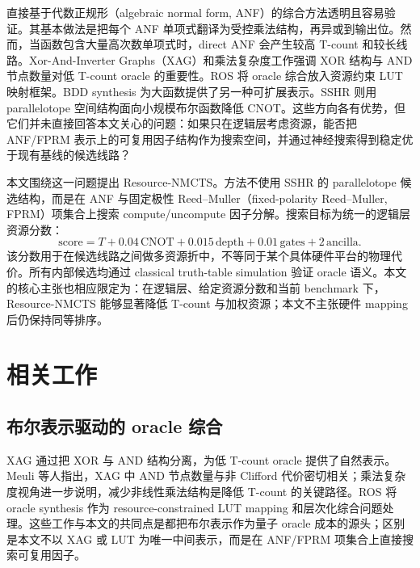 \documentclass[UTF8,fontset=macnew,11pt]{ctexart}
\newcommand{\method}{Resource-NMCTS}
\newcommand{\score}{\mathrm{score}}
\begin{document}
直接基于代数正规形（algebraic normal form, ANF）的综合方法透明且容易验证。其基本做法是把每个 ANF 单项式翻译为受控乘法结构，再异或到输出位。然而，当函数包含大量高次数单项式时，direct ANF 会产生较高 T-count 和较长线路。Xor-And-Inverter Graphs（XAG）和乘法复杂度工作强调 XOR 结构与 AND 节点数量对低 T-count oracle 的重要性\cite{meuli2022xag,meuli2019multiplicative}。ROS 将 oracle 综合放入资源约束 LUT 映射框架\cite{meuli2020ros}。BDD synthesis 为大函数提供了另一种可扩展表示\cite{wille2009bdd}。SSHR 则用 parallelotope 空间结构面向小规模布尔函数降低 CNOT\cite{zheng2025sshr}。这些方向各有优势，但它们并未直接回答本文关心的问题：如果只在逻辑层考虑资源，能否把 ANF/FPRM 表示上的可复用因子结构作为搜索空间，并通过神经搜索得到稳定优于现有基线的候选线路？

本文围绕这一问题提出 \method{}。方法不使用 SSHR 的 parallelotope 候选结构，而是在 ANF 与固定极性 Reed--Muller（fixed-polarity Reed--Muller, FPRM）项集合上搜索 compute/uncompute 因子分解。搜索目标为统一的逻辑层资源分数：
\begin{equation}
  \score = T + 0.04\,\mathrm{CNOT} + 0.015\,\mathrm{depth}
         + 0.01\,\mathrm{gates} + 2\,\mathrm{ancilla}.
  \label{eq:score}
\end{equation}
该分数用于在候选线路之间做多资源折中，不等同于某个具体硬件平台的物理代价。所有内部候选均通过 classical truth-table simulation 验证 oracle 语义。本文的核心主张也相应限定为：在逻辑层、给定资源分数和当前 benchmark 下，\method{} 能够显著降低 T-count 与加权资源；本文不主张硬件 mapping 后仍保持同等排序。

\section{相关工作}

\subsection{布尔表示驱动的 oracle 综合}

XAG 通过把 XOR 与 AND 结构分离，为低 T-count oracle 提供了自然表示。Meuli 等人指出，XAG 中 AND 节点数量与非 Clifford 代价密切相关\cite{meuli2022xag}；乘法复杂度视角进一步说明，减少非线性乘法结构是降低 T-count 的关键路径\cite{meuli2019multiplicative}。ROS 将 oracle synthesis 作为 resource-constrained LUT mapping 和层次化综合问题处理\cite{meuli2020ros}。这些工作与本文的共同点是都把布尔表示作为量子 oracle 成本的源头；区别是本文不以 XAG 或 LUT 为唯一中间表示，而是在 ANF/FPRM 项集合上直接搜索可复用因子。
\end{document}
